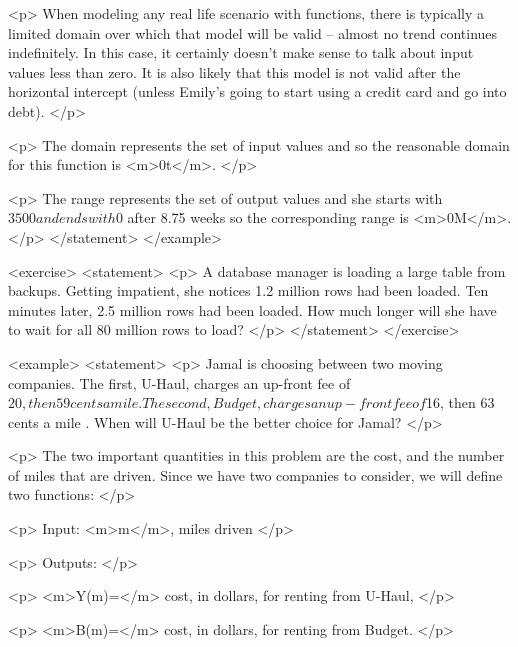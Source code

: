             <p>
                When modeling any real life scenario with functions, there is typically a limited domain over which that model will be valid – almost no trend continues indefinitely.
                In this case, it certainly doesn’t make sense to talk about input values less than zero.
                It is also likely that this model is not valid after the horizontal intercept (unless Emily’s going to start using a credit card and go into debt).
            </p>

            <p>
                The domain represents the set of input values and so the reasonable domain for this function is <m>0\leq t</m>.
            </p>

            <p>
                The range represents the set of output values and she starts with $3500 and ends with $0 after 8.75 weeks so the corresponding range is <m>0\leq M</m>.
            </p>
        </statement>
    </example>

    <exercise>
        <statement>
            <p>
                A database manager is loading a large table from backups.
                Getting impatient, she notices 1.2 million rows had been loaded.
                Ten minutes later, 2.5 million rows had been loaded.
                How much longer will she have to wait for all 80 million rows to load?
            </p>
        </statement>
    </exercise>

    <example>
        <statement>
            <p>
                Jamal is choosing between two moving companies.
                The first, U-Haul, charges an up-front fee of $20, then 59 cents a mile.
                The second, Budget, charges an up-front fee of $16, then 63 cents a mile .
                When will U-Haul be the better choice for Jamal?
            </p>

            <p>
                The two important quantities in this problem are the cost, and the number of miles that are driven.
                Since we have two companies to consider, we will define two functions:
            </p>

            <p>
                Input: <m>m</m>, miles driven
            </p>

            <p>
                Outputs:
            </p>

            <p>
                <m>Y(m)=</m> cost, in dollars, for renting from U-Haul,
            </p>

            <p>
                <m>B(m)=</m> cost, in dollars, for renting from Budget.
            </p>

